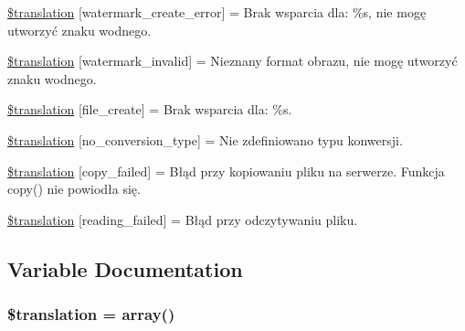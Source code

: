 \begin{DoxyCompactItemize}
\item 
\hyperlink{class_8upload_8pl___p_l_8php_aabca0b65dadbc6184415c16375f284ca}{\$translation} \mbox{[}\textquotesingle{}watermark\+\_\+create\+\_\+error\textquotesingle{}\mbox{]} = \textquotesingle{}Brak wsparcia dla\+: \%s, nie mogę utworzyć znaku wodnego.\textquotesingle{}
\item 
\hyperlink{class_8upload_8pl___p_l_8php_ac336e7a5701e47ba4a05e9e498a3cc44}{\$translation} \mbox{[}\textquotesingle{}watermark\+\_\+invalid\textquotesingle{}\mbox{]} = \textquotesingle{}Nieznany format obrazu, nie mogę utworzyć znaku wodnego.\textquotesingle{}
\item 
\hyperlink{class_8upload_8pl___p_l_8php_a1ecb4673e4fb69e06b3f20b65cecf30a}{\$translation} \mbox{[}\textquotesingle{}file\+\_\+create\textquotesingle{}\mbox{]} = \textquotesingle{}Brak wsparcia dla\+: \%s.\textquotesingle{}
\item 
\hyperlink{class_8upload_8pl___p_l_8php_a4712d7ec28e9a7f17eb3338af2358363}{\$translation} \mbox{[}\textquotesingle{}no\+\_\+conversion\+\_\+type\textquotesingle{}\mbox{]} = \textquotesingle{}Nie zdefiniowano typu konwersji.\textquotesingle{}
\item 
\hyperlink{class_8upload_8pl___p_l_8php_a783c9358bcf54a054545b50098bc679b}{\$translation} \mbox{[}\textquotesingle{}copy\+\_\+failed\textquotesingle{}\mbox{]} = \textquotesingle{}Błąd przy kopiowaniu pliku na serwerze. Funkcja copy() nie powiodła się.\textquotesingle{}
\item 
\hyperlink{class_8upload_8pl___p_l_8php_a01bea14c9fd5f353f62db44beabfcd42}{\$translation} \mbox{[}\textquotesingle{}reading\+\_\+failed\textquotesingle{}\mbox{]} = \textquotesingle{}Błąd przy odczytywaniu pliku.\textquotesingle{}
\end{DoxyCompactItemize}


\subsection{Variable Documentation}
\hypertarget{class_8upload_8pl___p_l_8php_a1f198d410fecc3871ebdd468d343a5e3}{}
\subsubsection[{\$translation}]{\setlength{\rightskip}{0pt plus 5cm}\$translation = array()}\label{class_8upload_8pl___p_l_8php_a1f198d410fecc3871ebdd468d343a5e3}
\hypertarget{class_8upload_8pl___p_l_8php_ac7498e49b9771b04698029aa61c70821}{}
